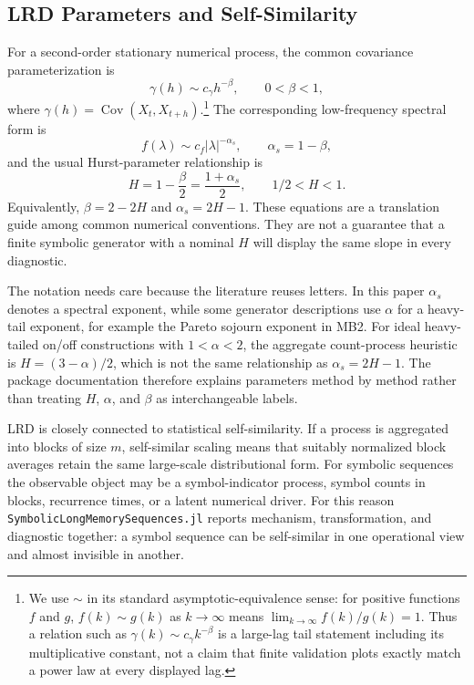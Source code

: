 \documentclass[journal]{IEEEtran}
\newcommand{\pkg}[1]{\texttt{#1}}
\newcommand{\sfive}{\pkg{SymbolicLongMemorySequences.jl}}
\begin{document}
\subsection{LRD Parameters and Self-Similarity}

For a second-order stationary numerical process, the common covariance
parameterization is
\begin{equation}
  \gamma(h) \sim c_\gamma h^{-\beta}, \qquad 0<\beta<1,
\end{equation}
where \(\gamma(h)=\operatorname{Cov}(X_t,X_{t+h})\).\footnote{We use
\(\sim\) in its standard asymptotic-equivalence sense: for positive functions
\(f\) and \(g\), \(f(k)\sim g(k)\) as \(k\to\infty\) means
\(\lim_{k\to\infty} f(k)/g(k)=1\). Thus a relation such as
\(\gamma(k)\sim c_\gamma k^{-\beta}\) is a large-lag tail statement including
its multiplicative constant, not a claim that finite validation plots exactly
match a power law at every displayed lag.}  The corresponding
low-frequency spectral form is
\begin{equation}
  f(\lambda) \sim c_f |\lambda|^{-\alpha_s},
  \qquad \alpha_s = 1-\beta,
\end{equation}
and the usual Hurst-parameter relationship is
\begin{equation}
  H = 1-\frac{\beta}{2}
    = \frac{1+\alpha_s}{2},
  \qquad 1/2 < H < 1.
\end{equation}
Equivalently, \(\beta=2-2H\) and \(\alpha_s=2H-1\).  These equations are a
translation guide among common numerical conventions.  They are not a guarantee
that a finite symbolic generator with a nominal \(H\) will display the same
slope in every diagnostic.

The notation needs care because the literature reuses letters.  In this paper
\(\alpha_s\) denotes a spectral exponent, while some generator descriptions use
\(\alpha\) for a heavy-tail exponent, for example the Pareto sojourn exponent in
MB2.  For ideal heavy-tailed on/off constructions with \(1<\alpha<2\), the
aggregate count-process heuristic is \(H=(3-\alpha)/2\), which is not the same
relationship as \(\alpha_s=2H-1\).  The package documentation therefore explains
parameters method by method rather than treating \(H\), \(\alpha\), and \(\beta\)
as interchangeable labels.

LRD is closely connected to statistical self-similarity.  If a process is
aggregated into blocks of size \(m\), self-similar scaling means that suitably
normalized block averages retain the same large-scale distributional form.  For
symbolic sequences the observable object may be a symbol-indicator process,
symbol counts in blocks, recurrence times, or a latent numerical driver.  For this reason \sfive{} reports mechanism, transformation, and diagnostic
together: a symbol sequence can be self-similar in one operational view and
almost invisible in another.
\end{document}
